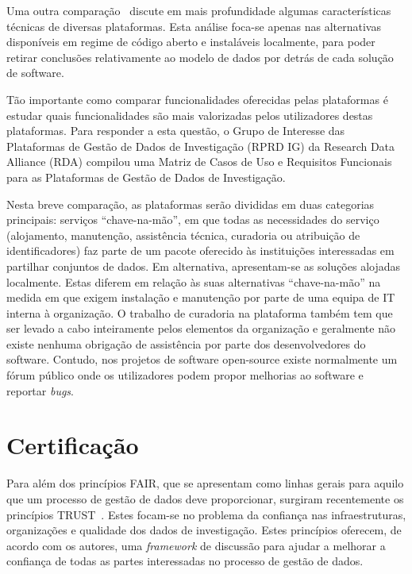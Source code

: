 \documentclass[sigconf,nonacm]{acmart}
\begin{document}
Uma outra comparação~\cite{amorimComparison2017} discute em mais profundidade algumas características técnicas de diversas plataformas. Esta análise foca-se apenas nas alternativas disponíveis em regime de código aberto e instaláveis localmente, para poder retirar conclusões relativamente ao modelo de dados por detrás de cada solução de software. 

Tão importante como comparar funcionalidades oferecidas pelas plataformas é estudar quais funcionalidades são mais valorizadas pelos utilizadores destas plataformas. Para responder a esta questão, o Grupo de Interesse das Plataformas de Gestão de Dados de Investigação (RPRD IG) da Research Data Alliance (RDA) compilou uma Matriz de Casos de Uso e Requisitos Funcionais para as Plataformas de Gestão de Dados de Investigação.

Nesta breve comparação, as plataformas serão divididas em duas categorias principais: serviços ``chave-na-mão'', em que todas as necessidades do serviço (alojamento, manutenção, assistência técnica, curadoria ou atribuição de identificadores) faz parte de um pacote oferecido às instituições interessadas em partilhar conjuntos de dados. Em alternativa, apresentam-se as soluções alojadas localmente. Estas diferem em relação às suas alternativas ``chave-na-mão'' na medida em que exigem instalação e manutenção por parte de uma equipa de IT interna à organização. O trabalho de curadoria na plataforma também tem que ser levado a cabo inteiramente pelos elementos da organização e geralmente não existe nenhuma obrigação de assistência por parte dos desenvolvedores do software. Contudo, nos projetos de software open-source existe normalmente um fórum público onde os utilizadores podem propor melhorias ao software e reportar \textit{bugs}.





\section{Certificação}

Para além dos princípios FAIR, que se apresentam como linhas gerais para aquilo que um processo de gestão de dados deve proporcionar, surgiram recentemente os princípios TRUST~\cite{TRUSTprinciples}. Estes focam-se no problema da confiança nas infraestruturas, organizações e qualidade dos dados de investigação. Estes princípios oferecem, de acordo com os autores, uma \emph{framework} de discussão para ajudar a melhorar a confiança de todas as partes interessadas no processo de gestão de dados.
\end{document}
